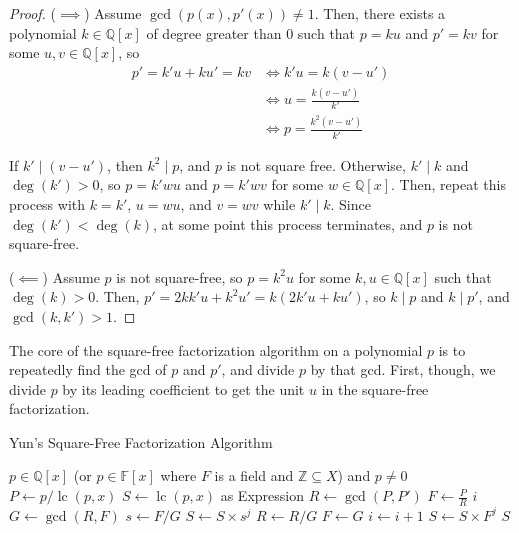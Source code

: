 \documentclass{article}
\theoremstyle{definition}
\DeclareMathOperator{\lc}{lc}
\begin{document}
    \begin{proof}
          ($\implies$) Assume $\gcd(p(x), p'(x)) \neq 1$. Then, there exists a polynomial $k \in \mathbb{Q}[x]$ of degree greater than $0$ such that $p = ku$ and $p' = kv$ for some $u, v \in \mathbb{Q}[x]$, so 
         \begin{align*}
             p' = k'u + ku' = kv & \iff k'u = k(v-u')\\
                                 & \iff u = \frac{k(v-u')}{k'}\\
                                 & \iff p = \frac{k^2(v-u')}{k'}
         \end{align*}
         
         If $k'\mid (v-u')$, then $k^2\mid p$, and $p$ is not square free. Otherwise, $k'\mid k$ and  $\deg(k') > 0$, so $p = k'wu$ and $p = k'wv$ for some $w \in \mathbb{Q}[x]$. Then, repeat this process with $k = k'$, $u = wu$, and $v = wv$ while $k'\mid k$. Since $\deg(k') < \deg(k)$, at some point this process terminates, and $p$ is not square-free.
         
         \hspace{0pt}
         
         ($\impliedby$) Assume $p$ is not square-free, so $p = k^2u$ for some $k, u \in \mathbb{Q}[x]$ such that $\deg(k) > 0$. Then, $p' = 2kk'u + k^2u' = k(2k'u+ku')$, so $k\mid p$ and $k\mid p'$, and $\gcd(k, k') > 1$.
    \end{proof}
    
    The core of the square-free factorization algorithm on a polynomial $p$ is to repeatedly find the gcd of $p$ and $p'$, and divide $p$ by that gcd. First, though, we divide $p$ by its leading coefficient to get the unit $u$ in the square-free factorization.
    
    \begin{algorithm}\small
    \caption{Yun's Square-Free Factorization Algorithm \cite{yun}}
        \begin{algorithmic}[1]
            \Require $p \in \mathbb{Q}[x]$ (or $p \in \mathbb{F}[x]$ where $F$ is a field and $\mathbb{Z} \subseteq X$) and $p \neq 0$
            \State $P \gets p/\lc(p, x)$
            \State $S \gets \lc(p, x)$ as Expression
            \State $R \gets \gcd(P, P')$
            \State $F \gets \frac{P}{R}$
            \State $i$ 
                \State $G \gets \gcd(R, F)$
                \State $s \gets F / G$
                \State $S \gets S \times s^j$
                \State $R \gets R / G$
                \State $F \gets G$
                \State $i \gets i + 1$
            \EndWhile
            \State $S \gets S \times F^j$
            \State \Return $S$
        \end{algorithmic}
    \end{algorithm}
    
\end{document}

